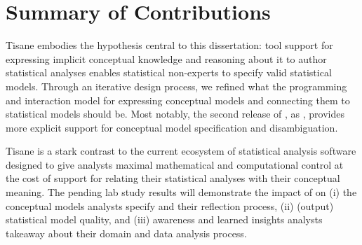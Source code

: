 












\section{Summary of Contributions}


Tisane embodies the hypothesis central to this dissertation: tool support for
expressing implicit conceptual knowledge and reasoning about it to author
statistical analyses enables statistical non-experts to specify valid
statistical models. Through an iterative design process, we refined what the
programming and interaction model for expressing conceptual models and
connecting them to statistical models should be. Most notably, the second
release of \tisane, as \rTisane, provides more explicit support for conceptual
model specification and disambiguation. 

Tisane is a stark contrast to the current ecosystem of statistical analysis
software designed to give analysts maximal mathematical and computational
control at the cost of support for relating their statistical analyses with
their conceptual meaning. The pending lab study results will demonstrate the
impact of \rTisane on (i) the conceptual models analysts specify and their
reflection process, (ii) (output) statistical model quality, and (iii) awareness
and learned insights analysts takeaway about their domain and data analysis
process. 

